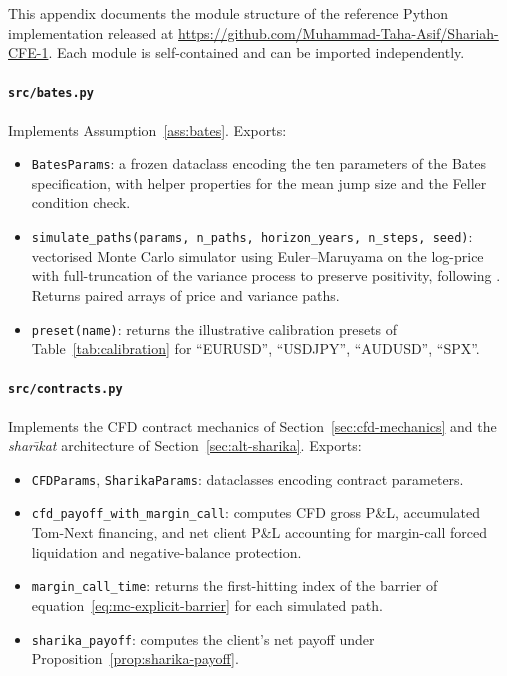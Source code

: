 \documentclass[preprint,12pt,authoryear]{elsarticle}
\theoremstyle{definition}
\begin{document}
This appendix documents the module structure of the reference
Python implementation released at
\url{https://github.com/Muhammad-Taha-Asif/Shariah-CFE-1}. Each
module is self-contained and can be imported independently.

\paragraph{\texttt{src/bates.py}}
Implements Assumption~\ref{ass:bates}. Exports:
\begin{itemize}
    \item \texttt{BatesParams}: a frozen dataclass encoding the
    ten parameters of the Bates specification, with helper
    properties for the mean jump size and the Feller condition
    check.
    \item \texttt{simulate\_paths(params, n\_paths, horizon\_years,
    n\_steps, seed)}: vectorised Monte Carlo simulator using
    Euler--Maruyama on the log-price with full-truncation of the
    variance process to preserve positivity, following
    \citet{Andersen2009}. Returns paired arrays of price and
    variance paths.
    \item \texttt{preset(name)}: returns the illustrative
    calibration presets of Table~\ref{tab:calibration} for
    ``EURUSD'', ``USDJPY'', ``AUDUSD'', ``SPX''.
\end{itemize}

\paragraph{\texttt{src/contracts.py}}
Implements the CFD contract mechanics of
Section~\ref{sec:cfd-mechanics} and the \emph{shar\={\i}kat}
architecture of Section~\ref{sec:alt-sharika}. Exports:
\begin{itemize}
    \item \texttt{CFDParams}, \texttt{SharikaParams}: dataclasses
    encoding contract parameters.
    \item \texttt{cfd\_payoff\_with\_margin\_call}: computes CFD
    gross P\&L, accumulated Tom-Next financing, and net client
    P\&L accounting for margin-call forced liquidation and
    negative-balance protection.
    \item \texttt{margin\_call\_time}: returns the first-hitting
    index of the barrier of equation~\eqref{eq:mc-explicit-barrier}
    for each simulated path.
    \item \texttt{sharika\_payoff}: computes the client's net
    payoff under Proposition~\ref{prop:sharika-payoff}.
\end{itemize}
\end{document}
